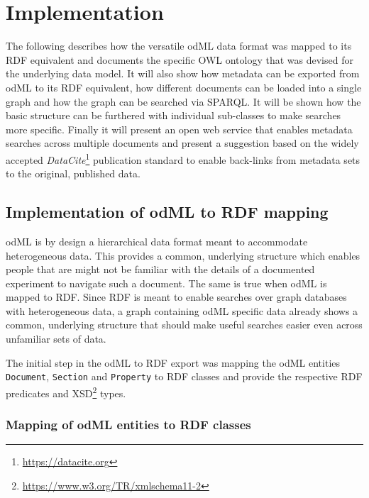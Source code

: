 \documentclass{article}
\begin{document}
\section{Implementation} \label{sec:implementation}

The following describes how the versatile odML data format was mapped to its RDF equivalent and documents the specific OWL ontology that was devised for the underlying data model. It will also show how metadata can be exported from odML to its RDF equivalent, how different documents can be loaded into a single graph and how the graph can be searched via SPARQL. It will be shown how the basic structure can be furthered with individual sub-classes to make searches more specific. Finally it will present an open web service that enables metadata searches across multiple documents and present a suggestion based on the widely accepted \textit{DataCite}\footnote{\url{https://datacite.org}} publication standard to enable back-links from metadata sets to the original, published data.

\subsection{Implementation of odML to RDF mapping} \label{sec::odml_rdf}


odML is by design a hierarchical data format meant to accommodate heterogeneous data. This provides a common, underlying structure which enables people that are might not be familiar with the details of a documented experiment to navigate such a document. The same is true when odML is mapped to RDF. Since RDF is meant to enable searches over graph databases with heterogeneous data, a graph containing odML specific data already shows a common, underlying structure that should make useful searches easier even across unfamiliar sets of data.

The initial step in the odML to RDF export was mapping the odML entities \texttt{Document}, \texttt{Section} and \texttt{Property} to RDF classes and provide the respective RDF predicates and XSD\footnote{\url{https://www.w3.org/TR/xmlschema11-2}} types.

\subsubsection{Mapping of odML entities to RDF classes} \label{sec:odml_rdf_mapping}
\end{document}
